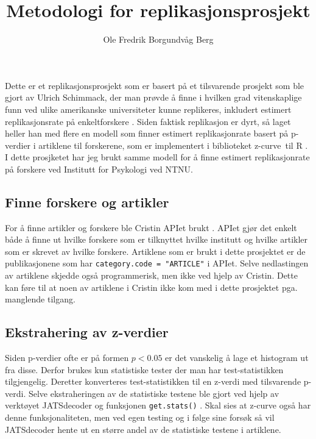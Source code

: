 \documentclass[doc,norsk]{apa7}
\title{Metodologi for replikasjonsprosjekt}
\author{Ole Fredrik Borgundvåg Berg}
\affiliation{NTNU}
\begin{document}
\maketitle

Dette er et replikasjonsprosjekt som er basert på et tilsvarende prosjekt som ble gjort av Ulrich Schimmack, der man prøvde å finne i hvilken grad vitenskaplige funn ved ulike amerikanske universiteter kunne replikeres, inkludert estimert replikasjonsrate på enkeltforskere \parencite{amerikansk-ranking}. Siden faktisk replikasjon er dyrt, så laget heller han med flere en modell som finner estimert replikasjonrate basert på p-verdier i artiklene til forskerene, som er implementert i biblioteket \guillemetleft z-curve\guillemetright\ til R \parencite{z-curve-modell, z-curve-implementasjon}. I dette prosjketet har jeg brukt samme modell for å finne estimert replikasjonrate på forskere ved Institutt for Psykologi ved NTNU.

\subsection{Finne forskere og artikler}
For å finne artikler og forskere ble Cristin APIet brukt \parencite{cristin-api}. APIet gjør det enkelt både å finne ut hvilke forskere som er tilknyttet hvilke institutt og hvilke artikler som er skrevet av hvilke forskere. Artiklene som er brukt i dette prosjektet er de publikasjonene som har \texttt{category.code = "ARTICLE"} i APIet. Selve nedlastingen av artiklene skjedde også programmerisk, men ikke ved hjelp av Cristin. Dette kan føre til at noen av artiklene i Cristin ikke kom med i dette prosjektet pga. manglende tilgang.

\subsection{Ekstrahering av z-verdier}
Siden p-verdier ofte er på formen $p < 0.05$ er det vanskelig å lage et histogram ut fra disse. Derfor brukes kun statistiske tester der man har test-statistikken tilgjengelig. Deretter konverteres test-statistikken til en z-verdi med tilsvarende p-verdi. Selve ekstraheringen av de statistiske testene ble gjort ved hjelp av verktøyet JATSdecoder og funksjonen \texttt{get.stats()} \parencite{jatsdecoder}. Skal sies at z-curve også har denne funksjonaliteten, men ved egen testing og i følge \textcite{jatsdecoder} sine forsøk så vil JATSdecoder hente ut en større andel av de statistiske testene i artiklene.
\end{document}
